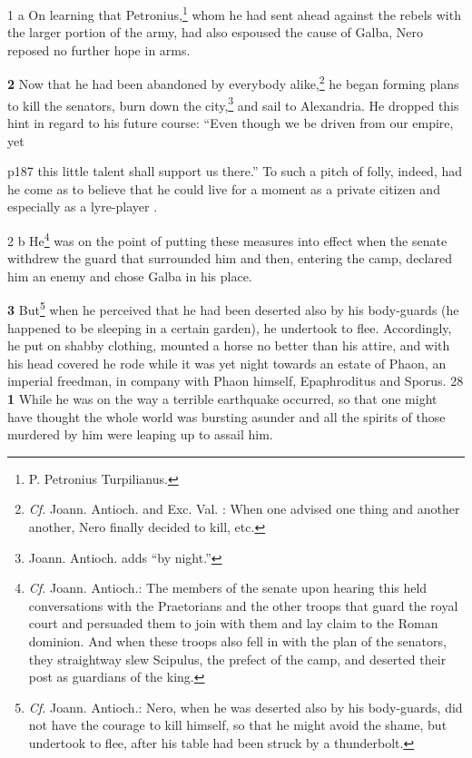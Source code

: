 1 a On learning that Petronius,\texthebrew{⁠}\footnote{P. Petronius Turpilianus.

} whom he had sent ahead against the rebels with the larger portion of the army, had also espoused the cause of Galba, Nero reposed no further hope in arms.

\textbf{2} Now that he had been abandoned by everybody alike,\texthebrew{⁠}\footnote{\emph{Cf.} Joann. Antioch. and Exc. Val. : When one advised one thing and another another, Nero finally decided to kill, etc.

} he began forming plans to kill the senators, burn down the city,\texthebrew{⁠}\footnote{Joann. Antioch. adds ``by night.''

} and sail to Alexandria. He dropped this hint in regard to his future course: ``Even though we be driven from our empire, yet

p187 this little talent shall support us there.'' To such a pitch of folly, indeed, had he come as to believe that he could live for a moment as a private citizen and especially as a lyre-player .

2 b He\texthebrew{⁠}\footnote{\emph{Cf.} Joann. Antioch.: The members of the senate upon hearing this held conversations with the Praetorians and the other troops that guard the royal court and persuaded them to join with them and lay claim to the Roman dominion. And when these troops also fell in with the plan of the senators, they straightway slew Scipulus, the prefect of the camp, and deserted their post as guardians of the king.

} was on the point of putting these measures into effect when the senate withdrew the guard that surrounded him and then, entering the camp, declared him an enemy and chose Galba in his place.

\textbf{3} But\texthebrew{⁠}\footnote{\emph{Cf.} Joann. Antioch.: Nero, when he was deserted also by his body-guards, did not have the courage to kill himself, so that he might avoid the shame, but undertook to flee, after his table had been struck by a thunderbolt.

} when he perceived that he had been deserted also by his body-guards (he happened to be sleeping in a certain garden), he undertook to flee. Accordingly, he put on shabby clothing, mounted a horse no better than his attire, and with his head covered he rode while it was yet night towards an estate of Phaon, an imperial freedman, in company with Phaon himself, Epaphroditus and Sporus.
28
\textbf{1} While he was on the way a terrible earthquake occurred, so that one might have thought the whole world was bursting asunder and all the spirits of those murdered by him were leaping up to assail him.

